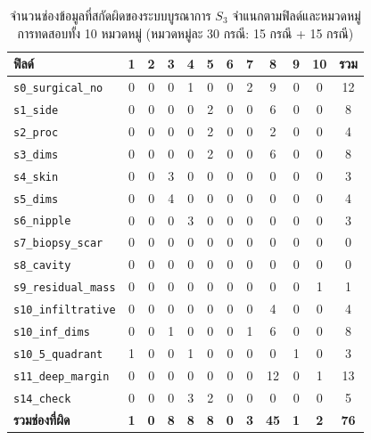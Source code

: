 \begin{table}[H]
\centering
\caption{จำนวนช่องข้อมูลที่สกัดผิดของระบบบูรณาการ $S_3$ จำแนกตามฟิลด์และหมวดหมู่การทดสอบทั้ง 10 หมวดหมู่ (หมวดหมู่ละ 30 กรณี:  15 กรณี +  15 กรณี)}
\label{tab:caterr}
\footnotesize\setlength{\tabcolsep}{4pt}
\begin{tabular}{|l|c|c|c|c|c|c|c|c|c|c|c|}
\hline
\textbf{ฟิลด์} & \textbf{1} & \textbf{2} & \textbf{3} & \textbf{4} & \textbf{5} & \textbf{6} & \textbf{7} & \textbf{8} & \textbf{9} & \textbf{10} & \textbf{รวม} \\
\hline
\texttt{s0\_surgical\_no} & 0 & 0 & 0 & 1 & 0 & 0 & 2 & 9 & 0 & 0 & 12 \\
\hline
\texttt{s1\_side} & 0 & 0 & 0 & 0 & 2 & 0 & 0 & 6 & 0 & 0 & 8 \\
\hline
\texttt{s2\_proc} & 0 & 0 & 0 & 0 & 2 & 0 & 0 & 2 & 0 & 0 & 4 \\
\hline
\texttt{s3\_dims} & 0 & 0 & 0 & 0 & 2 & 0 & 0 & 6 & 0 & 0 & 8 \\
\hline
\texttt{s4\_skin} & 0 & 0 & 3 & 0 & 0 & 0 & 0 & 0 & 0 & 0 & 3 \\
\hline
\texttt{s5\_dims} & 0 & 0 & 4 & 0 & 0 & 0 & 0 & 0 & 0 & 0 & 4 \\
\hline
\texttt{s6\_nipple} & 0 & 0 & 0 & 3 & 0 & 0 & 0 & 0 & 0 & 0 & 3 \\
\hline
\texttt{s7\_biopsy\_scar} & 0 & 0 & 0 & 0 & 0 & 0 & 0 & 0 & 0 & 0 & 0 \\
\hline
\texttt{s8\_cavity} & 0 & 0 & 0 & 0 & 0 & 0 & 0 & 0 & 0 & 0 & 0 \\
\hline
\texttt{s9\_residual\_mass} & 0 & 0 & 0 & 0 & 0 & 0 & 0 & 0 & 0 & 1 & 1 \\
\hline
\texttt{s10\_infiltrative} & 0 & 0 & 0 & 0 & 0 & 0 & 0 & 4 & 0 & 0 & 4 \\
\hline
\texttt{s10\_inf\_dims} & 0 & 0 & 1 & 0 & 0 & 0 & 1 & 6 & 0 & 0 & 8 \\
\hline
\texttt{s10\_5\_quadrant} & 1 & 0 & 0 & 1 & 0 & 0 & 0 & 0 & 1 & 0 & 3 \\
\hline
\texttt{s11\_deep\_margin} & 0 & 0 & 0 & 0 & 0 & 0 & 0 & 12 & 0 & 1 & 13 \\
\hline
\texttt{s14\_check} & 0 & 0 & 0 & 3 & 2 & 0 & 0 & 0 & 0 & 0 & 5 \\
\hline
\textbf{รวมช่องที่ผิด} & \textbf{1} & \textbf{0} & \textbf{8} & \textbf{8} & \textbf{8} & \textbf{0} & \textbf{3} & \textbf{45} & \textbf{1} & \textbf{2} & \textbf{76} \\
\hline
\end{tabular}
\end{table}

